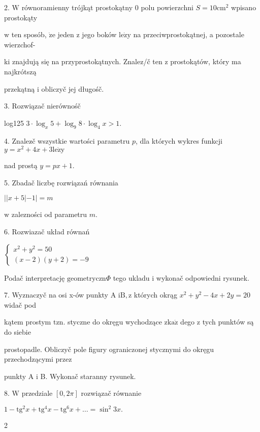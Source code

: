 \documentclass[a4paper,12pt]{article}
\begin{document}
2. $\mathrm{W}$ równoramienny trójkąt prostokątny $0$ polu powierzchni $S=10\mathrm{c}\mathrm{m}^{2}$ wpisano prostokąty

$\mathrm{w}$ ten sposób, $\dot{\mathrm{z}}\mathrm{e}$ jeden $\mathrm{z}$ jego boków $\mathrm{l}\mathrm{e}\dot{\mathrm{z}}\mathrm{y}$ na przeciwprostokątnej, a pozostale wierzchof-

ki znajdują się na przyprostokątnych. Znalez/č ten $\mathrm{z}$ prostokątów, który ma najkrótszą

przekątną $\mathrm{i}$ obliczyč jej długośč.

3. Rozwiązač nierównośč

log125 $3\cdot\log_{x}5+\log_{9}8\cdot\log_{4}x>1.$

4. Znalez$\acute{}$č wszystkie wartości parametru $p$, dla których wykres funkcji $y=x^{2}+4x+3\mathrm{l}\mathrm{e}\dot{\mathrm{z}}\mathrm{y}$

nad prostą $y=px+1.$

5. Zbadač liczbę rozwiązań równania

$||x+5|-1|=m$

$\mathrm{w}$ zalezności od parametru $m.$

6. Rozwiazač układ równań

$\left\{\begin{array}{l}
x^{2}+y^{2}=50\\
(x-2)(y+2)=-9
\end{array}\right.$

Podač interpretację $\mathrm{g}\mathrm{e}\mathrm{o}\mathrm{m}\mathrm{e}\mathrm{t}\mathrm{r}\mathrm{y}\mathrm{c}\mathrm{z}\mathrm{n}\Phi$ tego ukladu $\mathrm{i}$ wykonač odpowiedni rysunek.

7. Wyznaczyč na osi x-ów punkty A $\mathrm{i}\mathrm{B}, \mathrm{z}$ których okrąg $x^{2}+y^{2}-4x+2y=20$ widač pod

kątem prostym $\mathrm{t}\mathrm{z}\mathrm{n}$. styczne do okręgu wychodzące $\mathrm{z}\mathrm{k}\mathrm{a}\dot{\mathrm{z}}$ dego $\mathrm{z}$ tych punktów są do siebie

prostopadle. Obliczyč pole figury ograniczonej stycznymi do okręgu przechodzącymi przez

punkty A $\mathrm{i}$ B. Wykonač staranny rysunek.

8. $\mathrm{W}$ przedziale $[0,2\pi]$ rozwiązač równanie

$1-\mathrm{t}\mathrm{g}^{2}x+\mathrm{t}\mathrm{g}^{4}x-\mathrm{t}\mathrm{g}^{6}x+\ldots=\sin^{2}3x.$

2
\end{document}
